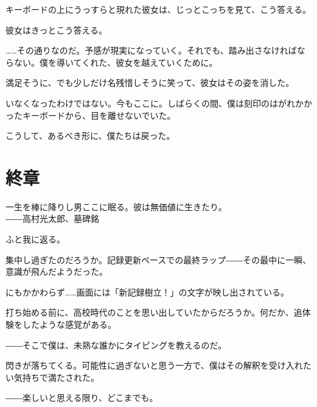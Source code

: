 キーボードの上にうっすらと現れた彼女は、じっとこっちを見て、こう答える。



彼女はきっとこう答える。


……その通りなのだ。予感が現実になっていく。それでも、踏み出さなければならない。僕を導いてくれた、彼女を越えていくために。





満足そうに、でも少しだけ名残惜しそうに笑って、彼女はその姿を消した。

いなくなったわけではない。今もここに。しばらくの間、僕は刻印のはがれかかったキーボードから、目を離せないでいた。

こうして、あるべき形に、僕たちは戻った。

\section*{終章}
\begin{screen}
一生を棒に降りし男ここに眠る。彼は無価値に生きたり。\\
――高村光太郎、墓碑銘
\end{screen}

ふと我に返る。

集中し過ぎたのだろうか。記録更新ペースでの最終ラップ――その最中に一瞬、意識が飛んだようだった。

にもかかわらず……画面には「新記録樹立！」の文字が映し出されている。

打ち始める前に、高校時代のことを思い出していたからだろうか。何だか、追体験をしたような感覚がある。

――そこで僕は、未熟な誰かにタイピングを教えるのだ。

閃きが落ちてくる。可能性に過ぎないと思う一方で、僕はその解釈を受け入れたい気持ちで満たされた。


――楽しいと思える限り、どこまでも。

